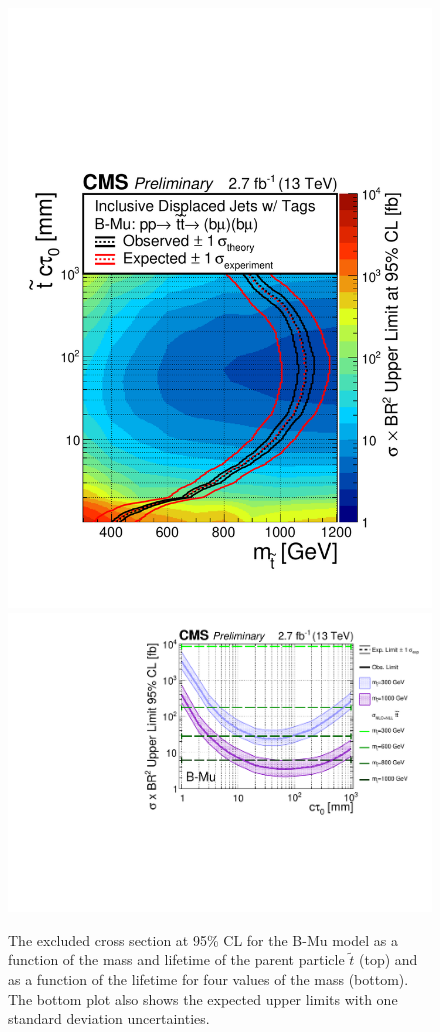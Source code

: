 \begin{figure}[tb]
\begin{center}
\includegraphics[width=.75\textwidth]{figures/pas//RESULT/UNBLINDED_LIMITS/B-Mu2D.pdf}
\includegraphics[width=.75\textwidth]{figures/pas//RESULT/UNBLINDED_LIMITS/B-Mu.pdf}
\caption{ The excluded cross section at 95\% CL for the B-Mu model as
  a function of the mass and lifetime of the parent particle
  $\tilde{t}$ (top) and as a function of the lifetime for four values
  of the mass (bottom).  The bottom plot also shows the expected upper
  limits with one standard deviation
  uncertainties.\label{fig:dsusy_limit_mu}}
\end{center}
\end{figure}
